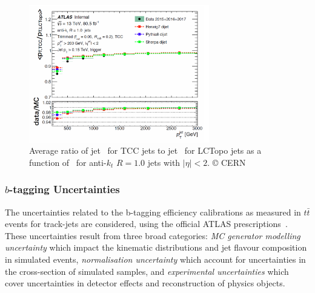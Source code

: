 \begin{figure}[htbp!]
\begin{center}
\includegraphics[width=0.7\textwidth]{tcc_track_calo_correlation.png}
\end{center}
\caption{Average ratio of jet \pt\ for TCC jets to jet \pt\ for LCTopo jets as a function of \pt\ for anti-$k_t$ $R=1.0$ jets with $|\eta| < 2$.
© CERN
}
\label{fig:tcc_lctopo_calib}
\end{figure}

\subsubsection{$b$-tagging Uncertainties}
The uncertainties related to the b-tagging efficiency calibrations as measured in $t\bar{t}$ events for track-jets are considered, using the official ATLAS prescriptions~\cite{Aad:2019aic, Aaboud:2018xwy}.
These uncertainties result from three broad categories: \textit{MC generator modelling uncertainty} which impact the kinematic distributions and jet flavour composition in simulated events, \textit{normalisation uncertainty} which account for uncertainties in the cross-section of simulated samples, and \textit{experimental uncertainties} which cover uncertainties in detector effects and reconstruction of physics objects.

